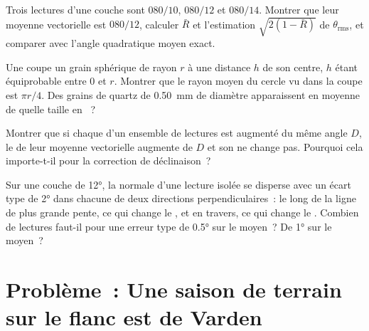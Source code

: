 \begin{exercise}[$\star\star$]\label{exo:b1:field-lab-methods-1:9}
Trois lectures d'une couche sont $080/10$, $080/12$ et $080/14$. Montrer que leur
moyenne vectorielle est $080/12$, calculer $\bar R$ et l'estimation
$\sqrt{2(1 - \bar R)}$ de $\theta_{\text{rms}}$, et comparer avec l'angle
quadratique moyen exact.
\end{exercise}

\begin{exercise}[$\star\star\star$]\label{exo:b1:field-lab-methods-1:10}
Une  coupe un grain sphérique de rayon $r$ à une distance $h$ de son
centre, $h$ étant équiprobable entre 0 et $r$. Montrer que le rayon moyen du
cercle vu dans la coupe est $\pi r/4$. Des grains de quartz de \qty{0.50}{mm} de
diamètre apparaissent en moyenne de quelle taille en ~?
\end{exercise}

\begin{exercise}[$\star\star\star$]\label{exo:b1:field-lab-methods-1:11}
Montrer que si chaque  d'un ensemble de lectures est augmenté du
même angle $D$, le  de leur moyenne vectorielle augmente de $D$ et
son  ne change pas. Pourquoi cela importe-t-il pour la correction de
déclinaison~?
\end{exercise}

\begin{exercise}[$\star\star\star$]\label{exo:b1:field-lab-methods-1:12}
Sur une couche de  \ang{12}, la normale d'une lecture isolée se disperse
avec un écart type de \ang{2} dans chacune de deux directions perpendiculaires~:
le long de la ligne de plus grande pente, ce qui change le , et en
travers, ce qui change le . Combien de lectures faut-il pour une
erreur type de \ang{0.5} sur le  moyen~? De \ang{1} sur le 
moyen~?
\end{exercise}

\section{Problème~: Une saison de terrain sur le flanc est de Varden}

